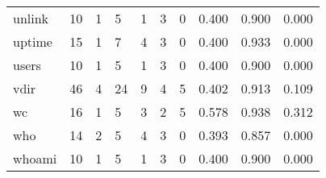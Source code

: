 \begin{longtable}{lp{1.3cm}p{1.3cm}p{1.3cm}p{1.3cm}p{1.3cm}p{1.3cm}p{1.3cm}p{1.3cm}p{1.3cm}}
unlink    &                     10 &                                             1 &                                            5 &                                           1 &                                            3 &                                          0 &                                0.400 &                                  0.900 &                                0.000 \\
uptime    &                     15 &                                             1 &                                            7 &                                           4 &                                            3 &                                          0 &                                0.400 &                                  0.933 &                                0.000 \\
users     &                     10 &                                             1 &                                            5 &                                           1 &                                            3 &                                          0 &                                0.400 &                                  0.900 &                                0.000 \\
vdir      &                     46 &                                             4 &                                           24 &                                           9 &                                            4 &                                          5 &                                0.402 &                                  0.913 &                                0.109 \\
wc        &                     16 &                                             1 &                                            5 &                                           3 &                                            2 &                                          5 &                                0.578 &                                  0.938 &                                0.312 \\
who       &                     14 &                                             2 &                                            5 &                                           4 &                                            3 &                                          0 &                                0.393 &                                  0.857 &                                0.000 \\
whoami    &                     10 &                                             1 &                                            5 &                                           1 &                                            3 &                                          0 &                                0.400 &                                  0.900 &                                0.000 \\

\end{longtable}
